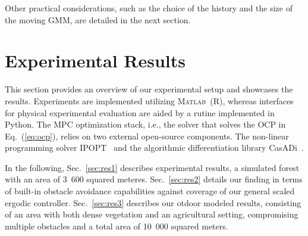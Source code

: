 \documentclass[letterpaper,10pt,conference,twoside]{IEEEtran}
\theoremstyle{definition}
\begin{document}
Other practical considerations, such as the choice of the history and the size of the moving GMM, are detailed in the next section.

\section{Experimental Results}\label{sec:res}
\noindent
This section provides an overview of our experimental setup and showcases the results. 
Experiments are implemented utilizing \textsc{Matlab}~(R), whereas interfaces for physical experimental evaluation are aided by a rutine implemented in Python. 
The MPC optimization stack, i.e., the solver that solves the OCP in Eq.~(\ref{eq:ocp}), relies on two external open-source components. The non-linear programming solver IPOPT~\cite{wachter2006implementation} and the algorithmic differentiation library CasADi~\cite{andersson2012casadi}.

In the following, Sec.~\ref{sec:res1} describes experimental results, a simulated forest with an area of 3~600 squared meteres. Sec.~\ref{sec:res2} details our finding in terms of built-in obstacle avoidance capabilities against coverage of our general scaled ergodic controller. Sec.~\ref{sec:res3} describes our otdoor modeled results, consisting of an area with both dense vegetation and an agricultural setting, compromising multiple obstacles and a total area of 10~000 squared meters.
\end{document}

